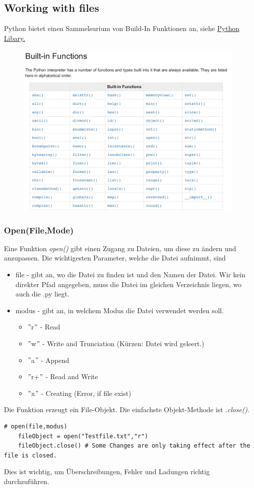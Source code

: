 \subsection{Working with files}
Python bietet einen Sammelsurium von Build-In Funktionen an, siehe \href{https://docs.python.org/3/library/functions.html}{Python Libary.}
\begin{figure}[H]
	\centering
	\includegraphics[scale = 0.3]{attachment/chapter_3/Scc071}
\end{figure}

\subsubsection{Open(File,Mode)}
Eine Funktion \textit{open()} gibt einen Zugang zu Dateien, um diese zu ändern und anzupassen. Die wichtigesten Parameter, welche die Datei aufnimmt, sind 
\begin{itemize} 
	\item file - gibt an, wo die Datei zu finden ist und den Namen der Datei. Wir kein direkter Pfad angegeben, muss die Datei im gleichen Verzeichnis liegen, wo auch die .py liegt.
	\item modus - gibt an, in welchem Modus die Datei verwendet werden soll.
	\begin{itemize}
		\item $"$r$"$ - Read
		\item $"$w$"$ - Write and Trunciation (Kürzen: Datei wird geleert.)
		\item $"$a$"$ - Append
		\item $"$r+$"$ - Read and Write
		\item $"$x$"$ - Creating (Error, if file exist)
	\end{itemize}
\end{itemize}
Die Funktion erzeugt ein File-Objekt. Die einfachste Objekt-Methode ist \textit{.close()}.
\begin{lstlisting}[style=python]
	# open(file,modus)
	fileObject = open("Testfile.txt","r")
	fileObject.close() # Some Changes are only taking effect after the file is closed. 
\end{lstlisting}
Dies ist wichtig, um Überschreibungen, Fehler und Ladungen richtig durchzuführen.

